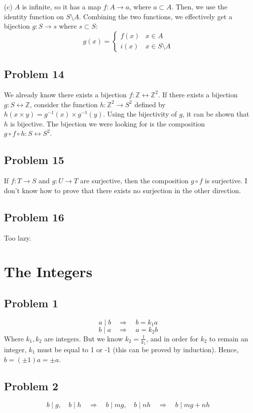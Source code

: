 \documentclass{book}
\begin{document}
\noindent
(c)
$A$ is infinite, so it has a map $f: A \rightarrow a$, where $a \subset A$. Then, we use the identity function on $S \setminus A$. Combining the two functions, we effectively get a bijection $g: S \rightarrow s$ where $s \subset S$:
$$g(x) = \begin{cases}
    f(x) & x \in A \\
    i(x) & x \in S \setminus A
\end{cases}$$

\subsection*{Problem 14}
We already know there exists a bijection $f: \mathbb{Z} \leftrightarrow \mathbb{Z}^2$. If there exists a bijection $g: S \leftrightarrow \mathbb{Z}$, consider the function $h: \mathbb{Z}^2 \rightarrow S^2$ defined by $h(x \times y) = g^{-1}(x) \times g^{-1}(y)$. Using the bijectivity of $g$, it can be shown that $h$ is bijective. The bijection we were looking for is the composition $g \circ f \circ h: S \leftrightarrow S^2$.

\subsection*{Problem 15}
If $f: T \rightarrow S$ and $g: U \rightarrow T$ are surjective, then the composition $g \circ f$ is surjective. I don't know how to prove that there exists no surjection in the other direction.

\subsection*{Problem 16}
Too lazy.

\section{The Integers}

\subsection*{Problem 1}
$$a \mid b \quad \Rightarrow \quad b = k_1 a$$
$$b \mid a \quad \Rightarrow \quad a = k_2 b$$
Where $k_1, k_2$ are integers. But we know $k_2 = \frac{1}{k_1}$, and in order for $k_2$ to remain an integer, $k_1$ must be equal to 1 or -1 (this can be proved by induction). Hence, $b = (\pm 1)a = \pm a$.

\subsection*{Problem 2}
$$b \mid g, \quad b \mid h \quad \Rightarrow \quad b \mid mg, \quad b \mid nh \quad \Rightarrow \quad b \mid mg + nh$$
\end{document}
